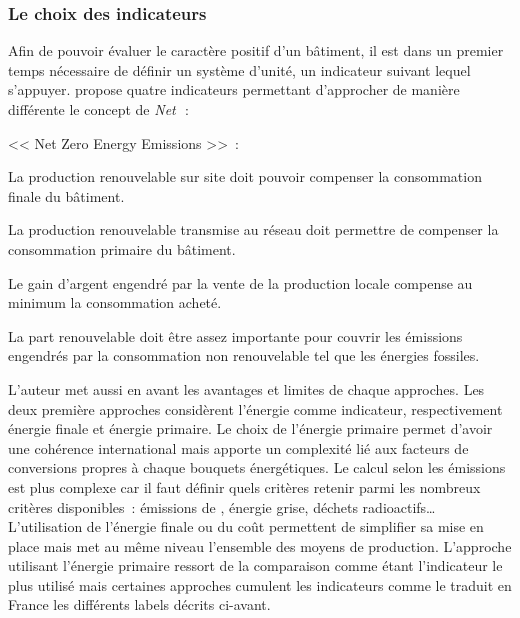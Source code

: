 \subsubsection{Le choix des indicateurs} %
\label{ssub:le_choix_des_indicateurs}
Afin de pouvoir évaluer le caractère positif d’un bâtiment, il est dans un premier
temps nécessaire de définir un système d’unité, un indicateur suivant lequel
s’appuyer. \textcite{Torcellini2006} propose quatre indicateurs permettant
d’approcher de manière différente le concept de \textit{Net}\,~:
\begin{blockdescription}{<< Net Zero Energy Emissions >>~:}
    \item[\enquote{Net Zero Site Energy}~:] La production renouvelable sur site
          doit pouvoir compenser la consommation finale du bâtiment.
    \item[\enquote{Net Zero Source Energy}~:] La production renouvelable transmise au réseau
          doit permettre de compenser la consommation primaire du bâtiment.
    \item[\enquote{Net Zero Energy Costs}~:] Le gain d’argent engendré par la vente
           de la production locale compense au minimum la consommation acheté.
    \item[\enquote{Net Zero Energy Emissions}~:] La part renouvelable doit être assez
           importante pour couvrir les émissions engendrés par la consommation non
           renouvelable tel que les énergies fossiles.
\end{blockdescription}
L’auteur met aussi en avant les avantages et limites de chaque approches. Les
deux première approches considèrent l’énergie comme indicateur, respectivement énergie
finale et énergie primaire. Le choix de l’énergie primaire permet d’avoir une cohérence international
mais apporte un complexité lié aux facteurs de conversions propres à chaque bouquets
énergétiques.
Le calcul selon les émissions
est plus complexe car il faut définir quels critères retenir parmi les nombreux critères
disponibles~: émissions de , énergie grise, déchets radioactifs\dots
L’utilisation de l’énergie finale ou du coût permettent de simplifier sa mise en place
mais met au même niveau l’ensemble des moyens de production.
L’approche utilisant l’énergie primaire ressort de la comparaison comme étant l’indicateur le
plus utilisé mais certaines approches cumulent les indicateurs comme le traduit en France les différents
labels décrits ci-avant.


